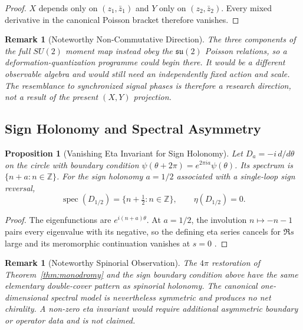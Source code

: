 \documentclass[11pt]{article}
\newtheorem{proposition}[theorem]{Proposition}
\newtheorem{remark}[theorem]{Remark}
\begin{document}
\begin{proof}
$X$ depends only on $(z_1,\bar z_1)$ and $Y$ only on
$(z_2,\bar z_2)$.  Every mixed derivative in the canonical Poisson bracket
therefore vanishes.
\end{proof}

\begin{remark}[Noteworthy Non-Commutative Direction]
The three components of the full $SU(2)$ moment map instead obey the
$\mathfrak{su}(2)$ Poisson relations, so a deformation-quantization programme
could begin there.  It would be a different observable algebra and would still
need an independently fixed action and scale.  The resemblance to synchronized
signal phases is therefore a research direction, not a result of the present
$(X,Y)$ projection.
\end{remark}

\subsection{Sign Holonomy and Spectral Asymmetry}

\begin{proposition}[Vanishing Eta Invariant for Sign Holonomy]
\label{prop:eta_zero}
Let $D_a=-i\,d/d\theta$ on the circle with boundary condition
$\psi(\theta+2\pi)=e^{2\pi ia}\psi(\theta)$.  Its spectrum is
$\{n+a:n\in\mathbb Z\}$.  For the sign holonomy $a=1/2$ associated with a
single-loop sign reversal,
\[
 \operatorname{spec}(D_{1/2})=\{n+\tfrac12:n\in\mathbb Z\},
 \qquad
 \eta(D_{1/2})=0.
\]
\end{proposition}

\begin{proof}
The eigenfunctions are $e^{i(n+a)\theta}$.  At $a=1/2$, the involution
$n\mapsto-n-1$ pairs every eigenvalue with its negative, so the defining
eta series cancels for $\Re s$ large and its meromorphic continuation vanishes
at $s=0$ \cite{APS1975}.
\end{proof}

\begin{remark}[Noteworthy Spinorial Observation]
The $4\pi$ restoration of Theorem~\ref{thm:monodromy} and the sign boundary
condition above have the same elementary double-cover pattern as spinorial
holonomy.  The canonical one-dimensional spectral model is nevertheless
symmetric and produces no net chirality.  A non-zero eta invariant would
require additional asymmetric boundary or operator data and is not claimed.
\end{remark}
\end{document}

